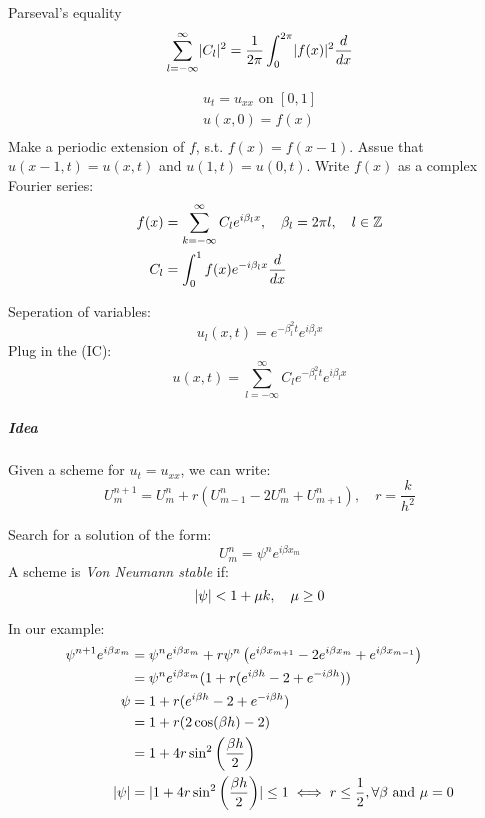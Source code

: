 \documentclass[a4paper, 10pt]{article}
\begin{document}
\begin{theorem}{Parseval's equality}{}
    \[
        \sum_{l=-\infty}^{\infty} \lvert C_l\rvert^2 = \frac{1}{2\pi} \int_0^{2\pi} \lvert f(x)\rvert^2 \frac{d}{d{x}}
    \]
\end{theorem}

\begin{example}{}{}
    \begin{align*}
        u_t = u_{xx} \text{ on } [0,1] \\
        u(x, 0) = f(x)                 \\
    \end{align*}
    Make a periodic extension of \(f\), s.t. \(f(x) = f(x-1)\).
    Assue that \(u(x-1, t) = u(x, t)\) and \(u(1, t) = u(0, t)\).
    Write \(f(x)\) as a complex Fourier series:
    \begin{align*}
        f(x) & = \sum_{k=-\infty}^{\infty} C_l e^{i \beta_l x}, \quad \beta_l = 2\pi l, \quad l \in \mathbb{Z} \\
        C_l  & = \int_0^1 f(x) e^{-i \beta_l x} \frac{d}{d{x}}
    \end{align*}

    Seperation of variables:
    \[
        u_l(x, t) = e^{-\beta_l^2 t} e^{i \beta_l x}
    \]
    Plug in the (IC):
    \[
        u(x, t) = \sum_{l=-\infty}^{\infty} C_l e^{-\beta_l^2 t} e^{i \beta_l x}
    \]
    \subparagraph{Idea}
    Given a scheme for \(u_t = u_{xx}\), we can write:
    \[
        U_m^{n+1} = U_m^n + r(U_{m-1}^n - 2U_m^n + U_{m+1}^n), \quad r = \frac{k}{h^2}
    \]

    Search for a solution of the form:
    \[
        U_m^n = \psi^n e^{i \beta x_m}
    \]
    A scheme is \textit{Von Neumann stable} if:
    \[
        \lvert\psi\rvert < 1 + \mu k, \quad \mu \geq 0
    \]

    In our example:
    \begin{align*}
        \psi^{n+1} e^{i \beta x_m} & = \psi^n e^{i \beta x_m} + r\psi^n\left(e^{i \beta x_{m+1}} - 2e^{i \beta x_m} + e^{i \beta x_{m-1}}\right) \\
                                   & = \psi^n e^{i \beta x_m} (1 + r(e^{i \beta h} - 2 + e^{-i \beta h}))                                        \\
        \psi                       & = 1 + r(e^{i \beta h} - 2 + e^{-i \beta h})                                                                 \\
                                   & = 1 + r(2\cos(\beta h) - 2)                                                                                     \\
                                      & = 1 + 4r\sin^2\left(\frac{\beta h}{2}\right)                                                                    \\
        \lvert\psi\rvert                 & = \lvert1 + 4r\sin^2\left(\frac{\beta h}{2}\right)\rvert \leq 1 \iff r \leq \frac{1}{2}, \forall \beta \text{ and } \mu = 0
    \end{align*}
\end{example}


\end{document}
